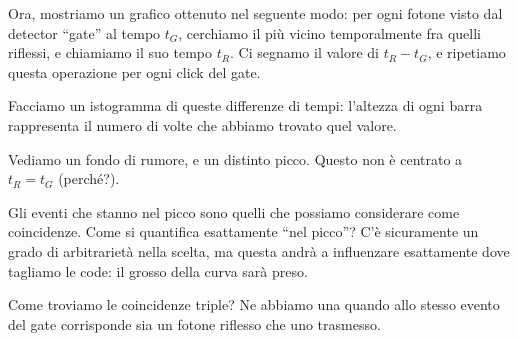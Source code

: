 \documentclass{article}
\begin{document}
Ora, mostriamo un grafico ottenuto nel seguente modo: per ogni fotone visto dal detector ``gate'' al tempo \(t_G\), cerchiamo il più vicino temporalmente fra quelli riflessi, e chiamiamo il suo tempo \(t_R\). 
Ci segnamo il valore di \(t_R - t_G\), e ripetiamo questa operazione per ogni click del gate. 

Facciamo un istogramma di queste differenze di tempi: l'altezza di ogni barra rappresenta il numero di volte che abbiamo trovato quel valore.


Vediamo un fondo di rumore, e un distinto picco. Questo non è centrato a \(t_R = t_G\) (perché?). 

Gli eventi che stanno nel picco sono quelli che possiamo considerare come coincidenze. 
Come si quantifica esattamente ``nel picco''? C'è sicuramente un grado di arbitrarietà nella scelta, ma questa andrà a influenzare esattamente dove tagliamo le code: il grosso della curva sarà preso.

Come troviamo le coincidenze triple? Ne abbiamo una quando allo stesso evento del gate corrisponde sia un fotone riflesso che uno trasmesso.

\printbibliography
\end{document}
